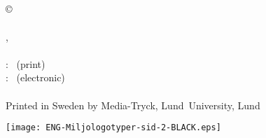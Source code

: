 \vfill
{\small
  \myCoverFront\\
  \\
  \myCoverBack\\
  \\
  \myFundingInformation


  \vspace{5mm}
  \noindent\copyright\, \myName~\myYear\\
  \\
  \myFaculty, {\myDepartment}
  \\
  \\
  \ISBN: \myISBNprint~(print)\\ %
  \ISBN: \myISBNpdf~(electronic)\\ %
  \\
  Printed in Sweden by Media-Tryck, Lund~University, Lund~\myYear

  \medskip

  \noindent\texttt{[image: ENG-Miljologotyper-sid-2-BLACK.eps]}
}
